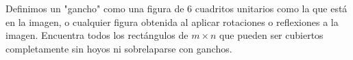 Definimos un "gancho" como una figura de 6 cuadritos unitarios como la que está en la imagen, o cualquier figura obtenida al aplicar rotaciones o reflexiones a la imagen. Encuentra todos los rectángulos de $m\times n$ que pueden ser cubiertos completamente sin hoyos ni sobrelaparse con ganchos.
